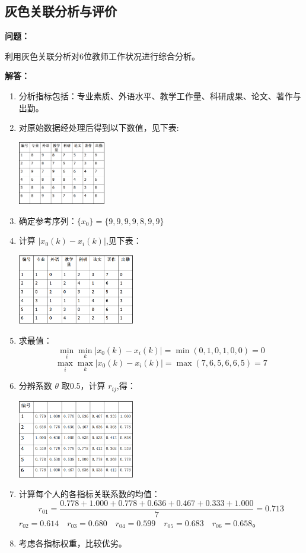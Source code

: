 \documentclass[12pt,a4paper]{article}
\begin{document}
\subsection{灰色关联分析与评价}
\textbf{问题：}

利用灰色关联分析对6位教师工作状况进行综合分析。

\textbf{解答：}
\begin{enumerate}
  \item 分析指标包括：专业素质、外语水平、教学工作量、科研成果、论文、著作与出勤。
  \item 对原始数据经处理后得到以下数值，见下表:
  \begin{center}
    \includegraphics[width = 0.3\textwidth]{figures/2-data.png}
  \end{center}
  \item 确定参考序列：$\{x_0\} = \{9, 9, 9, 9, 8, 9, 9\}$
  \item 计算 $|x_0(k) - x_i(k)|$,见下表：
  \begin{center}
    \includegraphics[width = 0.4\textwidth]{figures/2-less.png}
  \end{center}
  \item 求最值：
  $$\min_i\min_k|x_0(k) - x_i(k)| = \min(0,1,0,1,0,0) = 0$$
  $$\max_i\max_k|x_0(k) - x_i(k)| = \max(7,6,5,6,6,5) = 7$$
  \item 分辨系数 $\theta$ 取0.5，计算 $r_{ij}$,得：
  \begin{center}
    \includegraphics[width = 0.4\textwidth]{figures/rij.png}
  \end{center}
  \item 计算每个人的各指标关联系数的均值：
  $$r_{01} = \frac{0.778+1.000+0.778+0.636+0.467+0.333+1.000}{7} = 0.713$$
  $r_{02} = 0.614\quad r_{03} = 0.680\quad r_{04} = 0.599\quad r_{05} = 0.683\quad r_{06} = 0.658$。
  \item 考虑各指标权重，比较优劣。
\end{enumerate}
\end{document}
